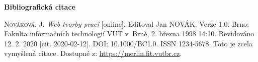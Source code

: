 \bigskip

\noindent \textbf{Bibliografická citace}

\medskip

\noindent \textsc{Nováková}, J. \textit{Web tvorby prací} [online]. Editoval Jan NOVÁK. Verze 1.0. Brno: Fakulta informačních technologií VUT v~Brně, 2. března 1998 14:10. Revidováno 12. 2. 2020 [cit. 2020-02-12]. DOI: 10.1000/BC1.0. ISSN 1234-5678. Toto je zcela vymyšlená citace. Dostupné z: \url{https://merlin.fit.vutbr.cz}.